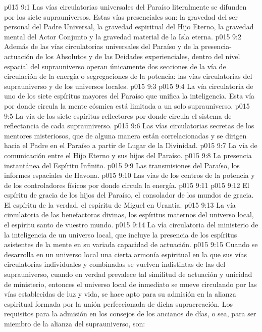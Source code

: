 \vs p015 9:1 Las vías circulatorias universales del Paraíso literalmente se difunden por los siete suprauniversos. Estas vías presenciales son: la gravedad del ser personal del Padre Universal, la gravedad espiritual del Hijo Eterno, la gravedad mental del Actor Conjunto y la gravedad material de la Isla eterna.
\vs p015 9:2 Además de las vías circulatorias universales del Paraíso y de la presencia\hyp{}actuación de los Absolutos y de las Deidades experienciales, dentro del nivel espacial del suprauniverso operan únicamente dos secciones de la vía de circulación de la energía o segregaciones de la potencia: las vías circulatorias del suprauniverso y de los universos locales.
\vs p015 9:3 \pc {}
\vs p015 9:4 La vía circulatoria de uno de los siete espíritus mayores del Paraíso que unifica la inteligencia. Esta vía por donde circula la mente cósmica está limitada a un solo suprauniverso.
\vs p015 9:5 La vía de los siete espíritus reflectores por donde circula el sistema de reflectancia de cada suprauniverso.
\vs p015 9:6 Las vías circulatorias secretas de los mentores misteriosos, que de alguna manera están correlacionadas y se dirigen hacia el Padre en el Paraíso a partir de Lugar de la Divinidad.
\vs p015 9:7 La vía de comunicación entre el Hijo Eterno y sus hijos del Paraíso.
\vs p015 9:8 La presencia instantánea del Espíritu Infinito.
\vs p015 9:9 Las transmisiones del Paraíso, los informes espaciales de Havona.
\vs p015 9:10 Las vías de los centros de la potencia y de los controladores físicos por donde circula la energía.
\vs p015 9:11 \pc {}
\vs p015 9:12 El espíritu de gracia de los hijos del Paraíso, el consolador de los mundos de gracia. El espíritu de la verdad, el espíritu de Miguel en Urantia.
\vs p015 9:13 La vía circulatoria de las benefactoras divinas, los espíritus maternos del universo local, el espíritu santo de vuestro mundo.
\vs p015 9:14 La vía circulatoria del ministerio de la inteligencia de un universo local, que incluye la presencia de los espíritus asistentes de la mente en su variada capacidad de actuación.
\vs p015 9:15 \pc Cuando se desarrolla en un universo local una cierta armonía espiritual en la que sus vías circulatorias individuales y combinadas se vuelven indistintas de las del suprauniverso, cuando en verdad prevalece tal similitud de actuación y unicidad de ministerio, entonces el universo local de inmediato se mueve circulando por las vías establecidas de luz y vida, se hace apto para su admisión en la alianza espiritual formada por la unión perfeccionada de dicha supracreación. Los requisitos para la admisión en los consejos de los ancianos de días, o sea, para ser miembro de la alianza del suprauniverso, son:
